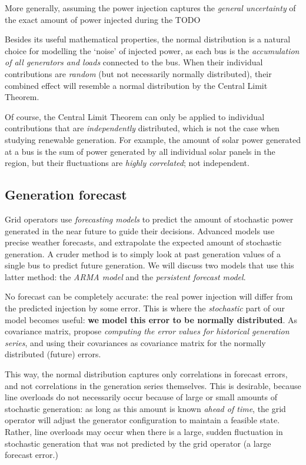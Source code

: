 \documentclass[main.tex]{subfiles}
\begin{document}
More generally, assuming the power injection captures the \emph{general uncertainty} of the exact amount of power injected during the TODO

Besides its useful mathematical properties, the normal distribution is a natural choice for modelling the `noise' of injected power, as each bus is the \emph{accumulation of all generators and loads} connected to the bus. When their individual contributions are \emph{random} (but not necessarily normally distributed), their combined effect will resemble a normal distribution by the Central Limit Theorem. 

Of course, the Central Limit Theorem can only be applied to individual contributions that are \emph{independently} distributed, which is not the case when studying renewable generation. For example, the amount of solar power generated at a bus is the sum of power generated by all individual solar panels in the region, but their fluctuations are \emph{highly correlated}; not independent.

\subsection{Generation forecast}\label{sec:generationforecast}
Grid operators use \emph{forecasting models} to predict the amount of stochastic power generated in the near future to guide their decisions. Advanced models use precise weather forecasts, and extrapolate the expected amount of stochastic generation. A cruder method is to simply look at past generation values of a single bus to predict future generation. We will discuss two models that use this latter method: the \emph{ARMA model} and the \emph{persistent forecast model}.

No forecast can be completely accurate: the real power injection will differ from the predicted injection by some error. This is where the \emph{stochastic} part of our model becomes useful: \textbf{we model this error to be normally distributed}. As covariance matrix, \cite{Nesti2018emergentfailures} propose \emph{computing the error values for historical generation series}, and using their covariances as covariance matrix for the normally distributed (future) errors.

This way, the normal distribution captures only correlations in forecast errors, and not correlations in the generation series themselves. This is desirable, because line overloads do not necessarily occur because of large or small amounts of stochastic generation: as long as this amount is known \emph{ahead of time}, the grid operator will adjust the generator configuration to maintain a feasible state. Rather, line overloads may occur when there is a large, sudden fluctuation in stochastic generation that was not predicted by the grid operator (\ie a large forecast error.)
\end{document}
